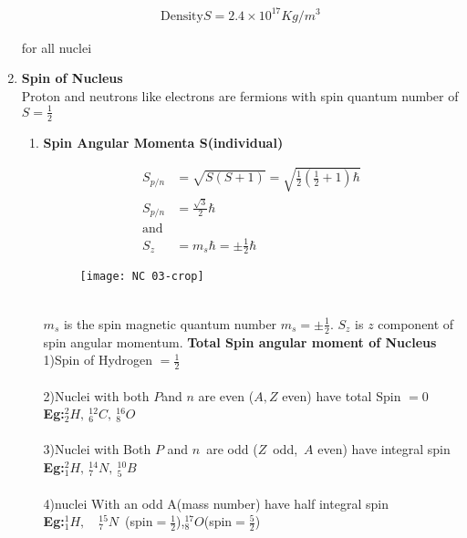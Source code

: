 \begin{enumerate}
\begin{center}
{{			\begin{align*}
			\text{Density}S=2.4\times10^{17}Kg/m^3
			\end{align*}} }
\end{center}
for all nuclei
\item \textbf{Spin of Nucleus}\\
Proton and neutrons like electrons are fermions with spin quantum number of $S=\frac{1}{2}$
\begin{enumerate}
	\item \textbf{Spin Angular Momenta S(individual)}$\left. \right. $\\
\begin{minipage}{0.45\textwidth}
	\begin{align*}
	S_{p/n}&=\sqrt{S(S+1)}=\sqrt{\frac{1}{2}\left(\frac{1}{2} +1\right) \hbar}\\
	S_{p/n}&=\frac{\sqrt{3}}{2}\hbar\\
	\text{and}\\
	S_z&=m_s\hbar=\pm\frac{1}{2}\hbar
	\end{align*}
\end{minipage}
\begin{minipage}{0.30\textwidth}
	\begin{figure}[H]
		\centering
		\texttt{[image: NC 03-crop]}
		\caption{}
		\label{Decreasing Function}
	\end{figure}
\end{minipage}\\
$m_s$ is the spin magnetic quantum number $m_s=\pm\frac{1}{2}$. $S_z$ is $z $ component of spin angular momentum.
 \textbf{Total Spin angular moment of Nucleus}\\
1)\quad Spin of Hydrogen $=\frac{1}{2}$\\\\
2)\quad Nuclei with both $P$and $n$ are even ($A,Z$ even) have total 
Spin $=0$\\
\textbf{Eg:}\quad $^2_2 H,\  ^{12}_6 C,\ ^{16}_8 O$\\\\
3)\quad Nuclei with Both $P$ and $n$\ are odd ($Z$\ odd,\ $A$ even) have 
 integral spin\\
\textbf{Eg:}\quad $^2_1 H,\  ^{14}_7 N,\ ^{10}_5 B$\\\\
4)\quad nuclei With an odd A(mass number) have half integral spin\\
\textbf{Eg:}\quad $^1_1 H,\quad ^{15}_7 N$\ (spin$=\frac{1}{2}$),\quad$^{17}_8 O$(spin$=\frac{5}{2}$)\\\\

\end{enumerate}
\end{enumerate}
